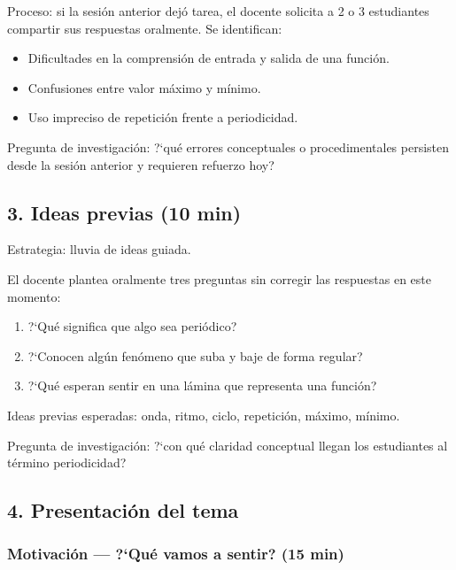 \documentclass[14pt, a4paper]{extarticle}
\begin{document}
Proceso: si la sesi\'on anterior dej\'o tarea, el docente solicita a 2 o 3
estudiantes compartir sus respuestas oralmente. Se identifican:

\begin{itemize}[itemsep=2pt]
  \item Dificultades en la comprensi\'on de entrada y salida de una funci\'on.
  \item Confusiones entre valor m\'aximo y m\'inimo.
  \item Uso impreciso de repetici\'on frente a periodicidad.
\end{itemize}

Pregunta de investigaci\'on: ?`qu\'e errores conceptuales o procedimentales
persisten desde la sesi\'on anterior y requieren refuerzo hoy?

\subsection{3. Ideas previas \normalfont(10 min)}

Estrategia: lluvia de ideas guiada.

El docente plantea oralmente tres preguntas sin corregir las respuestas en este
momento:

\begin{enumerate}[itemsep=3pt]
  \item ?`Qu\'e significa que algo sea peri\'odico?
  \item ?`Conocen alg\'un fen\'omeno que suba y baje de forma regular?
  \item ?`Qu\'e esperan sentir en una l\'amina que representa una funci\'on?
\end{enumerate}

Ideas previas esperadas: onda, ritmo, ciclo, repetici\'on, m\'aximo, m\'inimo.

Pregunta de investigaci\'on: ?`con qu\'e claridad conceptual llegan los
estudiantes al t\'ermino periodicidad?

\subsection{4. Presentaci\'on del tema}

\subsubsection*{Motivaci\'on --- ?`Qu\'e vamos a sentir? \normalfont(15 min)}
\end{document}
